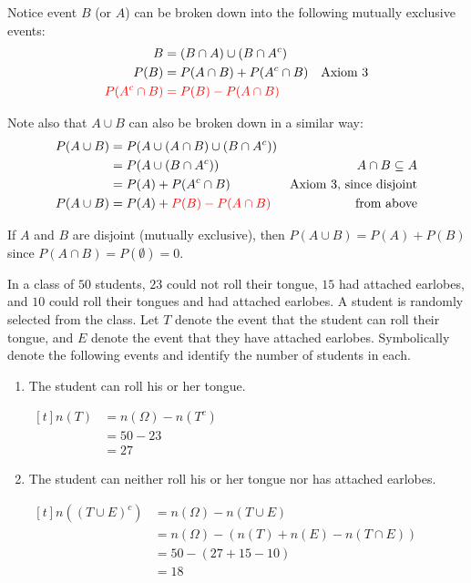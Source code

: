 \begin{example}
    Notice event $B$ (or $A$) can be broken down into the following mutually exclusive events: 
    $$\begin{aligned}[t] B & = (B \cap A) \cup (B \cap A^c) \\ P(B) & = P(A \cap B) + P(A^c \cap B) & \text{Axiom 3} \\ \color{red} P(A^c \cap B) & \color{red} = P(B) - P(A \cap B) \end{aligned}$$

    Note also that $A \cup B$ can also be broken down in a similar way: 
    $$\begin{aligned}[t] P(A \cup B) & = P(A \cup (A \cap B) \cup (B \cap A^c)) \\ & = P(A \cup (B \cap A^c)) & A \cap B \subseteq A \\ & = P(A) + P(A^c \cap B) & \text{Axiom 3, since disjoint} \\ P(A \cup B) & = P(A) + \color{red} P(B) - P(A \cap B) & \text{from above} \end{aligned}$$

    If $A$ and $B$ are disjoint (mutually exclusive), then $P(A \cup B) = P(A) + P(B)$ since $P(A \cap B) = P(\emptyset) = 0$. 
\end{example}

\begin{example}
    In a class of $50$ students, $23$ could not roll their tongue, $15$ had attached earlobes, and $10$ could roll their tongues and had attached earlobes. A student is randomly selected from the class. Let $T$ denote the event that the student can roll their tongue, and $E$ denote the event that they have attached earlobes. Symbolically denote the following events and identify the number of students in each.

    \begin{enumerate}[label=\alph*)]
        \item The student can roll his or her tongue.

        $\begin{aligned}[t]
            n(T) & = n(\Omega) - n(T^c) \\
                 & = 50 - 23            \\
                 & = 27
        \end{aligned}$

        \item The student can neither roll his or her tongue nor has attached earlobes.

        $\begin{aligned}[t]
            n\left( (T \cup E)^c \right) & = n(\Omega) - n(T \cup E)                 \\
                                         & = n(\Omega) - (n(T) + n(E) - n(T \cap E)) \\
                                         & = 50 - (27 + 15 - 10)                     \\
                                         & = 18
        \end{aligned}$
    \end{enumerate}
\end{example}

